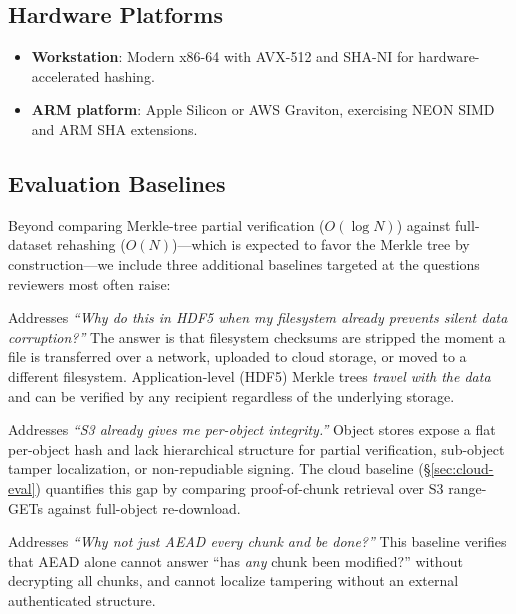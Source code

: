 \documentclass[11pt]{article}
\begin{document}
\subsection{Hardware Platforms}

\begin{itemize}[nosep]
  \item \textbf{Workstation}: Modern x86-64 with AVX-512 and SHA-NI for
    hardware-accelerated hashing.
  \item \textbf{ARM platform}: Apple Silicon or AWS Graviton, exercising NEON
    SIMD and ARM SHA extensions.
\end{itemize}

\subsection{Evaluation Baselines}

Beyond comparing Merkle-tree partial verification ($O(\log N)$) against
full-dataset rehashing ($O(N)$)---which is expected to favor the Merkle tree by
construction---we include three additional baselines targeted at the questions
reviewers most often raise:

\begin{description}[nosep]
  \item[Filesystem-level checksumming
    (ZFS~\cite{bonwick2003zfs}, Btrfs).] Addresses
    \emph{``Why do this in HDF5 when my filesystem already prevents silent
    data corruption?''} The answer is that filesystem checksums are stripped
    the moment a file is transferred over a network, uploaded to cloud
    storage, or moved to a different filesystem. Application-level (HDF5)
    Merkle trees \emph{travel with the data} and can be verified by any
    recipient regardless of the underlying storage.
  \item[Cloud object-store checksums (S3 ETag, GCS CRC32C).] Addresses
    \emph{``S3 already gives me per-object integrity.''} Object stores
    expose a flat per-object hash and lack hierarchical structure for
    partial verification, sub-object tamper localization, or
    non-repudiable signing. The cloud baseline (\S\ref{sec:cloud-eval})
    quantifies this gap by comparing proof-of-chunk retrieval over S3
    range-GETs against full-object re-download.
  \item[Per-chunk AEAD only (no Merkle tree).] Addresses
    \emph{``Why not just AEAD every chunk and be done?''} This baseline
    verifies that AEAD alone cannot answer ``has \emph{any} chunk been
    modified?'' without decrypting all chunks, and cannot localize
    tampering without an external authenticated structure.
\end{description}
\end{document}
